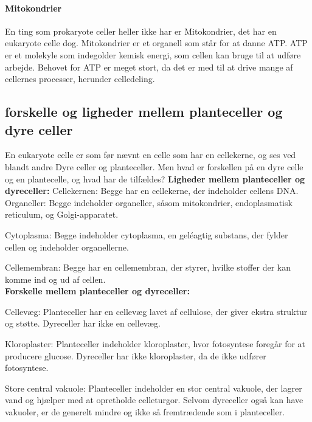             \paragraph{Mitokondrier}
                En ting som prokaryote celler heller ikke har er Mitokondrier, det har en eukaryote celle dog. Mitokondrier er et organell som står for at danne ATP.
                ATP er et molekyle som indegolder kemisk energi, som cellen kan bruge til at udføre arbejde. Behovet for ATP er meget stort, da det er med til at drive mange af cellernes processer, herunder celledeling.   
            
        \subsection{forskelle og ligheder mellem planteceller og dyre celler}
            En eukaryote celle er som før nævnt en celle som har en cellekerne, og ses ved blandt andre Dyre celler og planteceller. Men hvad er forskellen på en dyre celle og en plantecelle, og hvad har de tilfældes?
            \newline\textbf{Ligheder mellem planteceller og dyreceller:}\newline
            Cellekernen: Begge har en cellekerne, der indeholder cellens DNA.
            Organeller: Begge indeholder organeller, såsom mitokondrier, endoplasmatisk reticulum, og Golgi-apparatet.

            Cytoplasma: Begge indeholder cytoplasma, en geléagtig substans, der fylder cellen og indeholder organellerne.

            Cellemembran: Begge har en cellemembran, der styrer, hvilke stoffer der kan komme ind og ud af cellen. \\
            \textbf{Forskelle mellem planteceller og dyreceller:}\newline

            Cellevæg: Planteceller har en cellevæg lavet af cellulose, der giver ekstra struktur og støtte. Dyreceller har ikke en cellevæg.

            Kloroplaster: Planteceller indeholder kloroplaster, hvor fotosyntese foregår for at producere glucose. Dyreceller har ikke kloroplaster, da de ikke udfører fotosyntese.

            Store central vakuole: Planteceller indeholder en stor central vakuole, der lagrer vand og hjælper med at opretholde celleturgor. Selvom dyreceller også kan have vakuoler, er de generelt mindre og ikke så fremtrædende som i planteceller.

